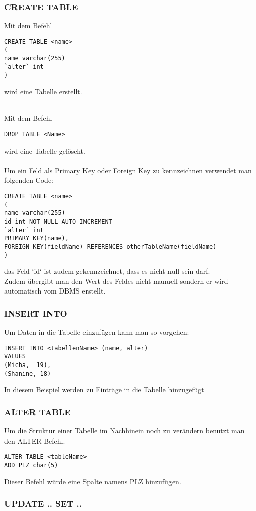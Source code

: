 \documentclass[asp1.tex]{subfiles}
\begin{document}
\subsubsection{CREATE TABLE}

Mit dem Befehl
\begin{lstlisting}
CREATE TABLE <name>
(
name varchar(255)
`alter` int
)
\end{lstlisting}
wird eine Tabelle erstellt. \\ \\

\break

Mit dem Befehl
\begin{lstlisting}
DROP TABLE <Name>
\end{lstlisting}
wird eine  Tabelle gelöscht. \\ \\
Um ein Feld als Primary Key oder Foreign Key zu kennzeichnen verwendet man folgenden Code:
\begin{lstlisting}
CREATE TABLE <name>
(
name varchar(255)
id int NOT NULL AUTO_INCREMENT
`alter` int
PRIMARY KEY(name),
FOREIGN KEY(fieldName) REFERENCES otherTableName(fieldName)
)
\end{lstlisting}
das Feld `id` ist zudem gekennzeichnet, dass es nicht null sein darf. \\
Zudem übergibt man den Wert des Feldes nicht manuell sondern er wird automatisch vom DBMS erstellt.
\subsubsection{INSERT INTO}
Um Daten in die Tabelle einzufügen kann man so vorgehen:
\begin{lstlisting}
INSERT INTO <tabellenName> (name, alter)
VALUES
(Micha,  19),
(Shanine, 18)
\end{lstlisting}
In diesem Beispiel werden zu Einträge in die Tabelle hinzugefügt

\subsubsection{ALTER TABLE}
Um die Struktur einer Tabelle  im Nachhinein noch  zu  verändern  benutzt  man den ALTER-Befehl.
\begin{lstlisting}
ALTER TABLE <tableName>
ADD PLZ char(5)
\end{lstlisting}
Dieser Befehl  würde  eine Spalte  namens  PLZ  hinzufügen.

\subsubsection{UPDATE .. SET ..}
\end{document}
